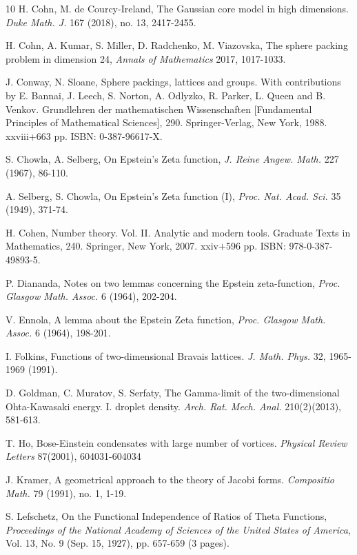 \documentclass[reqno,english]{amsart}
\newtheorem{open problem}{Open Problem}[section]
\newtheorem{open question}{Open Question}[section]
\newtheorem{open questions on hexagonal lattice}{Open Questions on hexagonal lattice}[section]
\begin{document}
\begin{thebibliography}{10}
H. Cohn, M. de Courcy-Ireland,
The Gaussian core model in high dimensions.
{\em Duke Math. J.} 167 (2018), no. 13, 2417-2455.


H. Cohn, A. Kumar, S. Miller, D. Radchenko, M. Viazovska, The sphere packing problem in dimension 24, {\em Annals of Mathematics} 2017, 1017-1033.

J. Conway, N. Sloane, Sphere packings, lattices and groups. With contributions by E. Bannai, J. Leech, S. Norton, A. Odlyzko, R. Parker, L. Queen and B. Venkov. Grundlehren der mathematischen Wissenschaften [Fundamental Principles of Mathematical Sciences], 290. Springer-Verlag, New York, 1988. xxviii+663 pp. ISBN: 0-387-96617-X.

S. Chowla, A. Selberg, On Epstein's Zeta function, {\em J. Reine Angew. Math.} 227
(1967), 86-110.


A. Selberg, S. Chowla, On Epstein's Zeta function (I), {\em Proc. Nat. Acad.
Sci.} 35 (1949), 371-74.


H. Cohen, Number theory. Vol. II. Analytic and modern tools. Graduate Texts in Mathematics, 240. Springer, New York, 2007. xxiv$+$596 pp. ISBN: 978-0-387-49893-5.

 P. Diananda, Notes on two lemmas concerning the Epstein zeta-function, {\em Proc. Glasgow
Math. Assoc.} 6 (1964), 202-204.


 V. Ennola, A lemma about the Epstein Zeta function, {\em Proc. Glasgow Math. Assoc.} 6
(1964), 198-201.


I. Folkins, Functions of two-dimensional Bravais lattices. {\em J. Math. Phys.}
32, 1965-1969 (1991).


 D. Goldman, C. Muratov, S. Serfaty, The Gamma-limit of the two-dimensional Ohta-Kawasaki
energy. I. droplet density. {\em  Arch. Rat. Mech. Anal.} 210(2)(2013), 581-613.

 T. Ho, Bose-Einstein condensates with large number of vortices. {\em Physical Review Letters} 87(2001), 604031-604034

J. Kramer,
A geometrical approach to the theory of Jacobi forms.
{\em Compositio Math.} 79 (1991), no. 1, 1-19.


S. Lefschetz, On the Functional Independence of Ratios of Theta Functions, {\it Proceedings of the National Academy of Sciences of the United States of America}, Vol. 13, No. 9 (Sep. 15, 1927), pp. 657-659 (3 pages).


\end{thebibliography}
\end{document}
